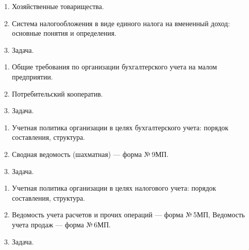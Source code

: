 \newpage


\shapkFull
\setcounter{zad}{0}

\begin{enumerate}
	\item Хозяйственные товарищества.

	\item Система налогообложения в виде единого налога на вмененный доход: основные понятия и определения.

	\item Задача.
\end{enumerate}

\newpage


\shapkFull
\setcounter{zad}{0}

\begin{enumerate}
	\item Общие требования по организации бухгалтерского учета на малом предприятии.

	\item Потребительский кооператив.

	\item Задача.
\end{enumerate}

\newpage


\shapkFull
\setcounter{zad}{0}

\begin{enumerate}
	\item Учетная политика организации в целях бухгалтерского учета: порядок составления, структура.

	\item Сводная ведомость (шахматная) --- форма №\,9МП.

	\item Задача.
\end{enumerate}

\newpage


\shapkFull
\setcounter{zad}{0}

\begin{enumerate}
	\item Учетная политика организации в целях налогового учета: порядок составления, структура.

	\item Ведомость учета расчетов и прочих операций --- форма №\,5МП, Ведомость учета продаж --- форма №\,6МП.

	\item Задача.
\end{enumerate}

